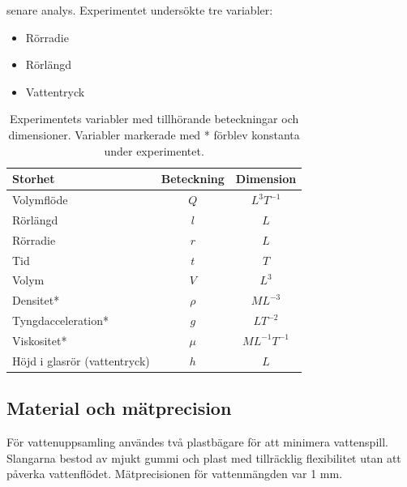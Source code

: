 \documentclass[a4paper,12pt]{article}
\begin{document}
senare analys. Experimentet undersökte tre variabler:
%
\begin{itemize}
    \item Rörradie
    \item Rörlängd
    \item Vattentryck
\end{itemize}
%
\begin{table}[ht]
    \centering
    \begin{tabular}{|l|c|c|}
        \hline
        \textbf{Storhet} & \textbf{Beteckning} & \textbf{Dimension} \\
        \hline
        Volymflöde & $Q$ & $L^3T^{-1}$ \\
        Rörlängd & $l$ & $L$ \\
        Rörradie & $r$ & $L$ \\
        Tid & $t$ & $T$ \\
        Volym & $V$ & $L^3$ \\
        Densitet* & $\rho$ & $ML^{-3}$ \\
        Tyngdacceleration* & $g$ & $LT^{-2}$ \\
        Viskositet* & $\mu$ & $ML^{-1}T^{-1}$ \\
        Höjd i glasrör (vattentryck) & $h$ & $L$ \\
        \hline
    \end{tabular}
    \caption{Experimentets variabler med tillhörande beteckningar och dimensioner. 
             Variabler markerade med * förblev konstanta under experimentet.}
\end{table}
%
\subsection{Material och mätprecision}
För vattenuppsamling användes två plastbägare för att minimera vattenspill. 
Slangarna bestod av mjukt gummi och plast med tillräcklig flexibilitet utan 
att påverka vattenflödet. Mätprecisionen för vattenmängden var 1 mm.
%
\end{document}
